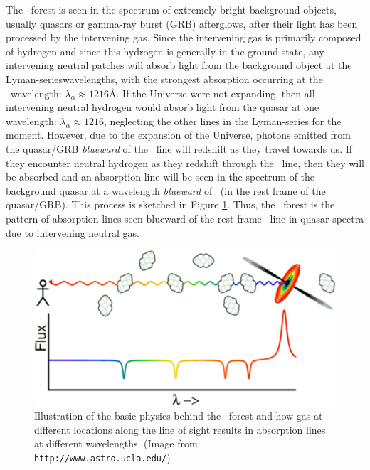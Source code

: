 The \lya\ forest is seen in the spectrum of extremely bright background objects, usually quasars  or gamma-ray burst (GRB) afterglows, after their light has been processed by the intervening gas. Since the intervening gas is primarily composed of hydrogen and since this hydrogen is generally in the ground state, any intervening neutral patches will absorb light from the background object at the Lyman-serieswavelengths, with the strongest absorption occurring at the \lya\ wavelength: $\lambda_{\alpha} \approx 1216$\AA. If the Universe were not expanding, then all intervening neutral hydrogen would absorb light from the quasar at one wavelength: $\lambda_{\alpha} \approx 1216$\angstrom, neglecting the other lines in the Lyman-series for the moment. However, due to the expansion of the Universe, photons emitted from the quasar/GRB \textit{blueward} of the \lya\ line will redshift as they travel towards us. If they encounter neutral hydrogen as they redshift through the \lya\ line, then they will be absorbed and an absorption line will be seen in the spectrum of the background quasar at a wavelength \textit{blueward} of \lya\ (in the rest frame of the quasar/GRB). This process is sketched in Figure \ref{fig:LyaCartoon}. Thus, the \lya\ forest is the pattern of absorption lines seen blueward of the rest-frame \lya\ line in quasar spectra due to intervening neutral gas. 

\begin{figure}[!p]
  \centering
  \includegraphics[width=12cm]{lyaf-75.eps}
  \caption{Illustration of the basic physics behind the \lya\ forest and how gas at different locations along the line of sight results in absorption lines at different wavelengths. (Image from {\tt http://www.astro.ucla.edu/})}
  \label{fig:LyaCartoon}
\end{figure}

